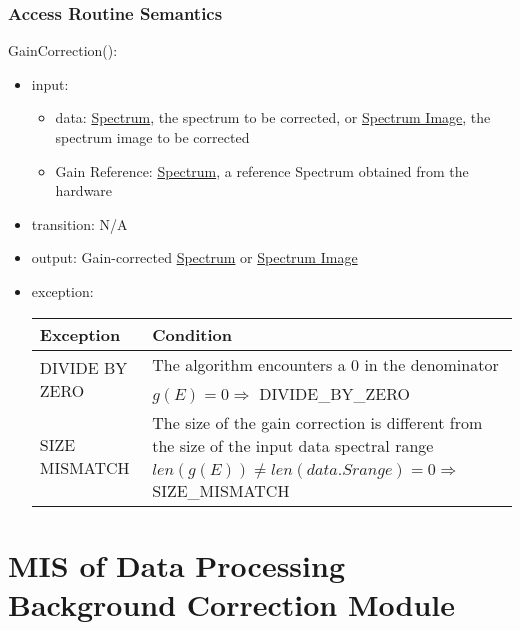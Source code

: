 \documentclass[12pt, titlepage]{article}
\begin{document}
\subsubsection{Access Routine Semantics}
\noindent GainCorrection():
\begin{itemize}
    \item input: 
    \begin{itemize}
        \item data: \hyperref[Mod:Spectrum]{Spectrum}, the spectrum to be
        corrected, or \hyperref[Mod:SI]{Spectrum Image}, the spectrum image to be
        corrected
        \item Gain Reference: \hyperref[Mod:Spectrum]{Spectrum}, a reference
        Spectrum obtained from the hardware
    \end{itemize}
    \item transition: N/A
    \item output: Gain-corrected \hyperref[Mod:Spectrum]{Spectrum} or
    \hyperref[Mod:SI]{Spectrum Image}
    \item exception:
    \begin{center}
        \begin{tabular}{p{3.5cm} p{12cm}}
            \toprule[0.15em]
            \textbf{Exception} & \textbf{Condition}\\
            \midrule[0.1em]
            \multirow{2}{0.25\textwidth}{DIVIDE BY ZERO} & The algorithm
            encounters a 0 in the denominator\\ 
            & $g(E) = 0 \Rightarrow$ DIVIDE\_BY\_ZERO\\ 
            \midrule[0.05em]
            \multirow{2}{0.25\textwidth}{SIZE MISMATCH} & The size of the gain
            correction is different from the size of the input data spectral range\\ 
            & $len(g(E)) \neq len(data.Srange) = 0 \Rightarrow$ SIZE\_MISMATCH\\
            
            \bottomrule[0.15em]
        \end{tabular}
    \end{center}
\end{itemize}


\section{MIS of Data Processing Background Correction Module}
\label{Mod:BackgroundCorr}
\end{document}
